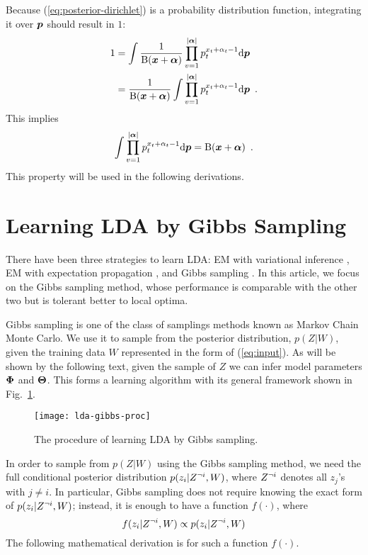 Because (\ref{eq:posterior-dirichlet}) is a probability distribution
function, integrating it over $\boldsymbol{p}$ should result in $1$:
\begin{equation}
  \begin{split}
  \label{eq:posterior-eq-1}
  1
  &=
  \int{
    \frac{1}{\operatorname{B}(\boldsymbol{x}+\boldsymbol{\alpha})}
    \prod_{v=1}^{|\boldsymbol{\alpha}|} p_t^{x_t+\alpha_t-1}
  }\mathrm{d}{\boldsymbol{p}}
  \\
  &=
  \frac{1}{\operatorname{B}(\boldsymbol{x}+\boldsymbol{\alpha})}
  \int{
    \prod_{v=1}^{|\boldsymbol{\alpha}|} p_t^{x_t+\alpha_t-1}
  }\mathrm{d}{\boldsymbol{p}}
  \enspace.
\end{split}
\end{equation}
This implies
\begin{equation}
  \label{eq:integrate-multinomial}
  \int{
    \prod_{v=1}^{|\boldsymbol{\alpha}|} p_t^{x_t+\alpha_t-1}
  }\mathrm{d}{\boldsymbol{p}}
  =
  \operatorname{B}(\boldsymbol{x}+\boldsymbol{\alpha})
  \enspace.
\end{equation}
This property will be used in the following derivations.


\section{Learning LDA by Gibbs Sampling}

There have been three strategies to learn LDA: EM with variational
inference \cite{lda_vem}, EM with expectation propagation
\cite{ep-lda}, and Gibbs sampling \cite{lda_gibbs}.  In this article,
we focus on the Gibbs sampling method, whose performance is comparable
with the other two but is tolerant better to local optima.

Gibbs sampling is one of the class of samplings methods known as
Markov Chain Monte Carlo.  We use it to sample from the posterior
distribution, $p(Z|W)$, given the training data $W$
represented in the form of (\ref{eq:input}).  As will be shown by the
following text, given the sample of $Z$ we can infer model
parameters $\boldsymbol{\Phi}$ and $\boldsymbol{\Theta}$.  This forms a learning
algorithm with its general framework shown in
Fig.~\ref{fig:lda-gibbs-proc}.

\begin{figure}
  \centering
  \texttt{[image: lda-gibbs-proc]}
  \caption{The procedure of learning LDA by Gibbs sampling.}
  \label{fig:lda-gibbs-proc}
\end{figure}

In order to sample from $p(Z|W)$ using the Gibbs
sampling method, we need the full conditional posterior distribution
$p(z_i|Z^{\neg i},W)$, where $Z^{\neg i}$ denotes all
$z_j$'s with $j\neq{}i$.  In particular, Gibbs sampling does not
require knowing the exact form of $p(z_i|Z^{\neg i},W)$;
instead, it is enough to have a function $f(\cdot)$, where
\begin{equation}
  \label{eq:f}
  f(z_i|Z^{\neg i},W) \propto p(z_i|Z^{\neg i},W)
\end{equation}
The following mathematical derivation is for such a function
$f(\cdot)$.

